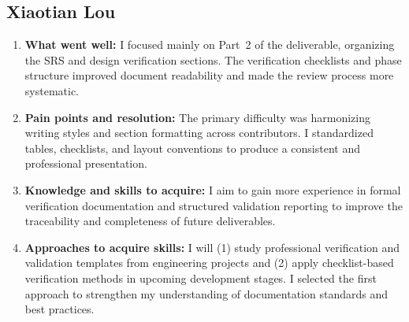 \documentclass[12pt, titlepage]{article}
\begin{document}
\subsection*{Xiaotian Lou}
\begin{enumerate}
  \item \textbf{What went well:}
        I focused mainly on Part~2 of the deliverable, organizing the SRS and design verification sections.
        The verification checklists and phase structure improved document readability and made the review
        process more systematic.

  \item \textbf{Pain points and resolution:}
        The primary difficulty was harmonizing writing styles and section formatting across contributors.
        I standardized tables, checklists, and layout conventions to produce a consistent and professional
        presentation.

  \item \textbf{Knowledge and skills to acquire:}
        I aim to gain more experience in formal verification documentation and structured validation
        reporting to improve the traceability and completeness of future deliverables.

  \item \textbf{Approaches to acquire skills:}
        I will (1) study professional verification and validation templates from engineering projects and
        (2) apply checklist-based verification methods in upcoming development stages. I selected the
        first approach to strengthen my understanding of documentation standards and best practices.
\end{enumerate}
\end{document}
